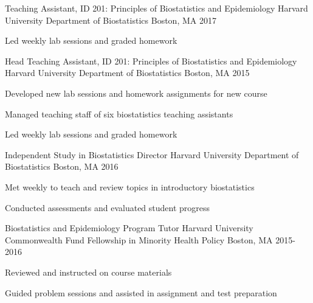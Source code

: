 

\begin{cventries}

  \cventry
    {Teaching Assistant, ID 201: Principles of Biostatistics and Epidemiology} %
    {Harvard University Department of Biostatistics} %
    {Boston, MA} %
    {2017} %
    {
      \begin{cvitems} %
        \item {Led weekly lab sessions and graded homework}
      \end{cvitems}
    }

  \cventry
    {Head Teaching Assistant, ID 201: Principles of Biostatistics and Epidemiology} %
    {Harvard University Department of Biostatistics} %
    {Boston, MA} %
    {2015} %
    {
      \begin{cvitems} %
        \item {Developed new lab sessions and homework assignments for new course}
        \item {Managed teaching staff of six biostatistics teaching assistants}
        \item {Led weekly lab sessions and graded homework}
      \end{cvitems}
    }

  \cventry
{Independent Study in Biostatistics Director} %
{Harvard University Department of Biostatistics} %
{Boston, MA} %
{2016} %
{
	\begin{cvitems} %
		\item {Met weekly to teach and review topics in introductory biostatistics}
		\item {Conducted assessments and evaluated student progress}
	\end{cvitems}
}

 \cventry
{ Biostatistics and Epidemiology Program Tutor} %
{Harvard University Commonwealth Fund Fellowship in Minority Health Policy} %
{Boston, MA} %
{2015-2016} %
{
	\begin{cvitems} %
		\item {Reviewed and instructed on course materials}
		\item {Guided problem sessions and assisted in assignment and test preparation}
	\end{cvitems}
}


\end{cventries}
